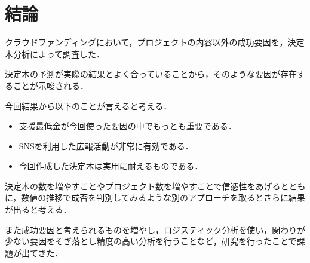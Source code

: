 \section{結論}
クラウドファンディングにおいて，プロジェクトの内容以外の成功要因を，決定木分析によって調査した．

決定木の予測が実際の結果とよく合っていることから，そのような要因が存在することが示唆される．

今回結果から以下のことが言えると考える．
\begin{itemize}
\item 支援最低金が今回使った要因の中でもっとも重要である．
 \item SNSを利用した広報活動が非常に有効である．
 \item 今回作成した決定木は実用に耐えるものである．
\end{itemize}

決定木の数を増やすことやプロジェクト数を増やすことで信憑性をあげるとともに，数値の推移で成否を判別してみるような別のアプローチを取るとさらに結果が出ると考える．

また成功要因と考えられるものを増やし，ロジスティック分析を使い，関わりが少ない要因をそぎ落とし精度の高い分析を行うことなど，研究を行ったことで課題が出てきた．







